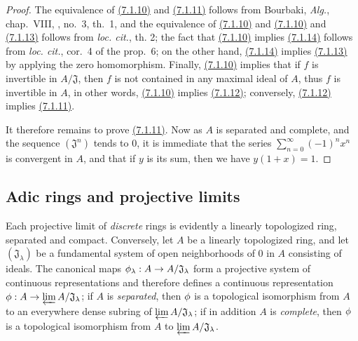 \begin{proof}
\label{proof-prop-0.7.1.10}
The equivalence of \hyperref[prop-0.7.1.10]{(7.1.10)} and \hyperref[cor-0.7.1.11]{(7.1.11)}
follows from Bourbaki, {\em Alg.}, chap.~VIII, , no.~3,
th.~1, and the equivalence of \hyperref[prop-0.7.1.10]{(7.1.10)} and
\hyperref[prop-0.7.1.10]{(7.1.10)} and \hyperref[cor-0.7.1.13]{(7.1.13)} follows from
{\em loc. cit.}, th. 2; the fact that \hyperref[prop-0.7.1.10]{(7.1.10)} implies
\hyperref[cor-0.7.1.14]{(7.1.14)} follows from {\em loc. cit.},
cor.~4 of the prop.~6; on the other hand, \hyperref[cor-0.7.1.14]{(7.1.14)} implies
\hyperref[cor-0.7.1.13]{(7.1.13)} by applying the zero homomorphism. Finally,
\hyperref[prop-0.7.1.10]{(7.1.10)} implies that if $f$ is invertible in $A/\mathfrak{J}$,
then $f$ is not contained in any maximal ideal of $A$, thus $f$ is invertible in $A$,
in other words, \hyperref[prop-0.7.1.10]{(7.1.10)} implies \hyperref[cor-0.7.1.12]{(7.1.12)};
conversely, \hyperref[cor-0.7.1.12]{(7.1.12)} implies \hyperref[cor-0.7.1.11]{(7.1.11)}.

It therefore remains to prove \hyperref[cor-0.7.1.11]{(7.1.11)}. Now as $A$ is separated and
complete, and the sequence $(\mathfrak{J}^n)$ tends to $0$, it is immediate that
the series $\sum_{n=0}^\infty(-1)^n x^n$ is convergent in $A$, and that if $y$
is its sum, then we have $y(1+x)=1$.
\end{proof}

\subsection{Adic rings and projective limits}
\label{subsection-adic-rings-and-projective-limits}

\begin{env}[7.2.1]
\label{env-0.7.2.1}
Each projective limit of {\em discrete} rings is evidently a linearly
topologized ring, separated and compact. Conversely, let $A$ be a linearly
topologized ring, and let $(\mathfrak{J}_\lambda)$ be a fundamental system of
open neighborhoods of $0$ in $A$ consisting of
ideals. The canonical maps $\phi_\lambda:A\to A/\mathfrak{J}_\lambda$ form
a projective system of continuous representations and therefore defines a
continuous representation $\phi:A\to\varprojlim A/\mathfrak{J}_\lambda$; if $A$
is {\em separated}, then $\phi$ is a topological isomorphism from $A$ to an
everywhere dense subring of $\varprojlim A/\mathfrak{J}_\lambda$; if in
addition $A$ is {\em complete}, then $\phi$ is a topological isomorphism from
$A$ to $\varprojlim A/\mathfrak{J}_\lambda$.
\end{env}

